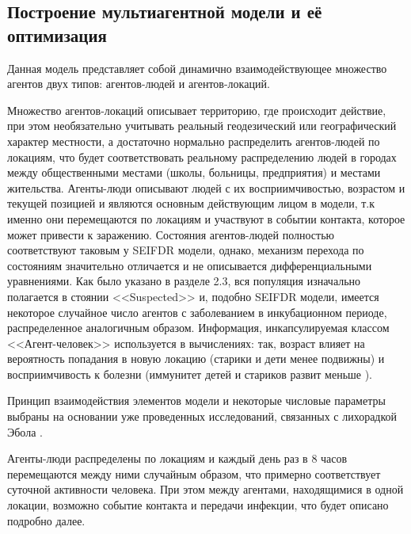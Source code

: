 \subsection{Построение мультиагентной модели и её оптимизация}

Данная модель представляет собой динамично взаимодействующее множество агентов двух типов: агентов-людей и агентов-локаций. 

Множество агентов-локаций описывает территорию, где происходит действие, при этом необязательно учитывать реальный геодезический или географический характер местности, а достаточно нормально распределить агентов-людей по локациям, что будет соответствовать реальному распределению людей в городах между общественными местами (школы, больницы, предприятия) и местами жительства.    Агенты-люди описывают людей с их восприимчивостью, возрастом и текущей позицией и являются основным действующим лицом в модели, т.к именно они перемещаются по локациям и участвуют в событии контакта, которое может привести к заражению. Состояния агентов-людей полностью соответствуют таковым у SEIFDR модели, однако, механизм перехода по состояниям значительно отличается и не описывается дифференциальными уравнениями. Как было указано в разделе 2.3, вся популяция изначально полагается в стоянии  <<Suspected>> и, подобно SEIFDR модели, имеется некоторое случайное число агентов с заболеванием в инкубационном периоде, распределенное аналогичным образом. Информация, инкапсулируемая классом <<Агент-человек>> используется в вычислениях: так, возраст влияет на вероятность попадания в новую локацию (старики и дети менее подвижны) и восприимчивость к болезни (иммунитет детей и стариков развит меньше %
).

Принцип взаимодействия элементов модели и некоторые числовые параметры выбраны на основании уже проведенных исследований, связанных с лихорадкой Эбола
. 

Агенты-люди распределены по локациям и каждый день раз в 8 часов перемещаются между ними случайным образом, что примерно соответствует суточной активности  человека. При этом между агентами, находящимися в одной локации, возможно событие контакта  и передачи инфекции, что будет описано подробно далее. 

